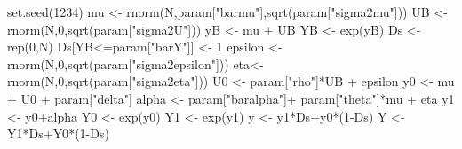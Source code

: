 \documentclass[
]{book}
\newenvironment{Shaded}{\begin{snugshade}}{\end{snugshade}}
\newcommand{\DecValTok}[1]{\textcolor[rgb]{0.00,0.00,0.81}{#1}}
\newcommand{\FunctionTok}[1]{\textcolor[rgb]{0.00,0.00,0.00}{#1}}
\newcommand{\NormalTok}[1]{#1}
\newcommand{\OtherTok}[1]{\textcolor[rgb]{0.56,0.35,0.01}{#1}}
\newcommand{\SpecialCharTok}[1]{\textcolor[rgb]{0.00,0.00,0.00}{#1}}
\newcommand{\StringTok}[1]{\textcolor[rgb]{0.31,0.60,0.02}{#1}}
\theoremstyle{definition}
\theoremstyle{definition}
\theoremstyle{definition}
\theoremstyle{definition}
\theoremstyle{remark}
\begin{document}
\begin{Shaded}
\begin{Highlighting}[]
\FunctionTok{set.seed}\NormalTok{(}\DecValTok{1234}\NormalTok{)}
\NormalTok{mu }\OtherTok{\textless{}{-}} \FunctionTok{rnorm}\NormalTok{(N,param[}\StringTok{"barmu"}\NormalTok{],}\FunctionTok{sqrt}\NormalTok{(param[}\StringTok{"sigma2mu"}\NormalTok{]))}
\NormalTok{UB }\OtherTok{\textless{}{-}} \FunctionTok{rnorm}\NormalTok{(N,}\DecValTok{0}\NormalTok{,}\FunctionTok{sqrt}\NormalTok{(param[}\StringTok{"sigma2U"}\NormalTok{]))}
\NormalTok{yB }\OtherTok{\textless{}{-}}\NormalTok{ mu }\SpecialCharTok{+}\NormalTok{ UB }
\NormalTok{YB }\OtherTok{\textless{}{-}} \FunctionTok{exp}\NormalTok{(yB)}
\NormalTok{Ds }\OtherTok{\textless{}{-}} \FunctionTok{rep}\NormalTok{(}\DecValTok{0}\NormalTok{,N)}
\NormalTok{Ds[YB}\SpecialCharTok{\textless{}=}\NormalTok{param[}\StringTok{"barY"}\NormalTok{]] }\OtherTok{\textless{}{-}} \DecValTok{1} 
\NormalTok{epsilon }\OtherTok{\textless{}{-}} \FunctionTok{rnorm}\NormalTok{(N,}\DecValTok{0}\NormalTok{,}\FunctionTok{sqrt}\NormalTok{(param[}\StringTok{"sigma2epsilon"}\NormalTok{]))}
\NormalTok{eta}\OtherTok{\textless{}{-}} \FunctionTok{rnorm}\NormalTok{(N,}\DecValTok{0}\NormalTok{,}\FunctionTok{sqrt}\NormalTok{(param[}\StringTok{"sigma2eta"}\NormalTok{]))}
\NormalTok{U0 }\OtherTok{\textless{}{-}}\NormalTok{ param[}\StringTok{"rho"}\NormalTok{]}\SpecialCharTok{*}\NormalTok{UB }\SpecialCharTok{+}\NormalTok{ epsilon}
\NormalTok{y0 }\OtherTok{\textless{}{-}}\NormalTok{ mu }\SpecialCharTok{+}\NormalTok{  U0 }\SpecialCharTok{+}\NormalTok{ param[}\StringTok{"delta"}\NormalTok{]}
\NormalTok{alpha }\OtherTok{\textless{}{-}}\NormalTok{ param[}\StringTok{"baralpha"}\NormalTok{]}\SpecialCharTok{+}\NormalTok{  param[}\StringTok{"theta"}\NormalTok{]}\SpecialCharTok{*}\NormalTok{mu }\SpecialCharTok{+}\NormalTok{ eta}
\NormalTok{y1 }\OtherTok{\textless{}{-}}\NormalTok{ y0}\SpecialCharTok{+}\NormalTok{alpha}
\NormalTok{Y0 }\OtherTok{\textless{}{-}} \FunctionTok{exp}\NormalTok{(y0)}
\NormalTok{Y1 }\OtherTok{\textless{}{-}} \FunctionTok{exp}\NormalTok{(y1)}
\NormalTok{y }\OtherTok{\textless{}{-}}\NormalTok{ y1}\SpecialCharTok{*}\NormalTok{Ds}\SpecialCharTok{+}\NormalTok{y0}\SpecialCharTok{*}\NormalTok{(}\DecValTok{1}\SpecialCharTok{{-}}\NormalTok{Ds)}
\NormalTok{Y }\OtherTok{\textless{}{-}}\NormalTok{ Y1}\SpecialCharTok{*}\NormalTok{Ds}\SpecialCharTok{+}\NormalTok{Y0}\SpecialCharTok{*}\NormalTok{(}\DecValTok{1}\SpecialCharTok{{-}}\NormalTok{Ds)}
\end{Highlighting}
\end{Shaded}
\end{document}
